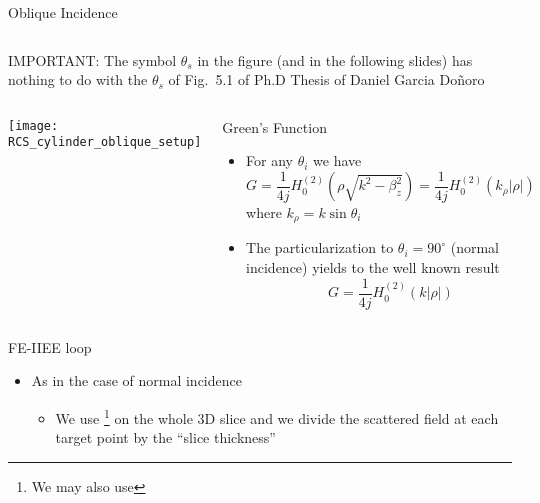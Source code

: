 \begin{frame}[allowframebreaks]{Oblique Incidence}
\begin{columns}
  \end{columns}

  \vbs
  
  \alert{IMPORTANT: The symbol $\theta_s$ in the figure (and in the
    following slides) has nothing to do with the $\theta_s$ of Fig.\
    5.1 of Ph.D Thesis of Daniel Garcia Doñoro}
  
    \framebreak %

  \begin{columns}
     \centering
    \texttt{[image: RCS\_cylinder\_oblique\_setup]}
    
     \centering
    \begin{block}{Green's Function}
      \begin{itemize}
      \item For any  $\theta_i$ we have
        \begin{equation*}
          G = \dfrac{1}{4j} H_0^{(2)}\left( \rho\sqrt{k^2-\beta_z^2}\right) 
          = \dfrac{1}{4j} H_0^{(2)}\left( k_\rho|\rho|\right)
        \end{equation*}
      where $k_\rho=k\sin\theta_i$
        
      \item The particularization to $\theta_i=90^\circ$ (normal
        incidence) yields to the well known result
        \begin{equation*}
          G = \dfrac{1}{4j} H_0^{(2)}(k|\rho|)
        \end{equation*}
        
      \end{itemize}
    \end{block}
  \end{columns}
  
    \framebreak %

    
    \begin{block}{FE-IIEE loop}
      \begin{itemize}
      \item As in the case of normal incidence
        \begin{itemize}
        \item We use {\GreenD}\footnote{We may also use {\GreenTEw}}
          on the whole 3D slice and we divide  the scattered field
          at each target point by the ``slice thickness''


\end{itemize}
\end{itemize}
\end{block}
\end{frame}

